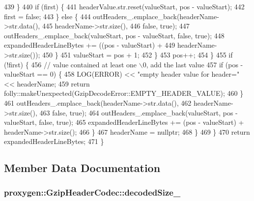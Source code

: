 \begin{DoxyCode}
439           \}
440           \textcolor{keywordflow}{if} (first) \{
441             headerValue.str.reset(valueStart, pos - valueStart);
442             first = \textcolor{keyword}{false};
443           \} \textcolor{keywordflow}{else} \{
444             outHeaders_.emplace\_back(headerName->str.data(),
445                                      headerName->str.size(),
446                                      \textcolor{keyword}{false}, \textcolor{keyword}{true});
447             outHeaders_.emplace\_back(valueStart, pos - valueStart, \textcolor{keyword}{false}, \textcolor{keyword}{true});
448             expandedHeaderLineBytes += ((pos - valueStart) +
449                                         headerName->str.size());
450           \}
451           valueStart = pos + 1;
452         \}
453         pos++;
454       \}
455       \textcolor{keywordflow}{if} (!first) \{
456         \textcolor{comment}{// value contained at least one \(\backslash\)0, add the last value}
457         \textcolor{keywordflow}{if} (pos - valueStart == 0) \{
458           LOG(ERROR) << \textcolor{stringliteral}{"empty header value for header="} << headerName;
459           \textcolor{keywordflow}{return} folly::makeUnexpected(GzipDecodeError::EMPTY_HEADER_VALUE);
460         \}
461         outHeaders_.emplace\_back(headerName->str.data(),
462                                  headerName->str.size(),
463                                  \textcolor{keyword}{false}, \textcolor{keyword}{true});
464         outHeaders_.emplace\_back(valueStart, pos - valueStart, \textcolor{keyword}{false}, \textcolor{keyword}{true});
465         expandedHeaderLineBytes += (pos - valueStart) + headerName->str.size();
466       \}
467       headerName = \textcolor{keyword}{nullptr};
468     \}
469   \}
470   \textcolor{keywordflow}{return} expandedHeaderLineBytes;
471 \}
\end{DoxyCode}


\subsection{Member Data Documentation}
\subsubsection[{decoded\+Size\+\_\+}]{ proxygen\+::\+Gzip\+Header\+Codec\+::decoded\+Size\+\_\+\hspace{0.3cm}{\ttfamily [private]}}\label{classproxygen_1_1GzipHeaderCodec_a2a1535ad0e5a01241cb5869c1c48af82}


